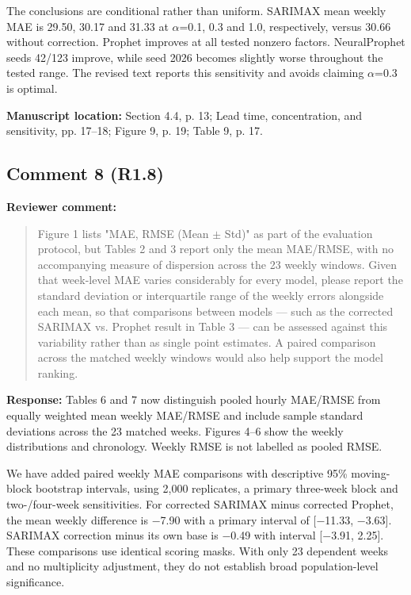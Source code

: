 \documentclass[11pt,a4paper]{article}
\begin{document}
The conclusions are conditional rather than uniform. SARIMAX mean weekly MAE is 29.50, 30.17 and 31.33 at $\alpha$=0.1, 0.3 and 1.0, respectively, versus 30.66 without correction. Prophet improves at all tested nonzero factors. NeuralProphet seeds 42/123 improve, while seed 2026 becomes slightly worse throughout the tested range. The revised text reports this sensitivity and avoids claiming $\alpha$=0.3 is optimal.

\textbf{Manuscript location:} Section 4.4, p. 13; Lead time, concentration, and sensitivity, pp. 17--18; Figure 9, p. 19; Table 9, p. 17.
\begin{samepage}
\subsection*{Comment 8 (R1.8)}
\textbf{Reviewer comment:}
\begin{quote}\small Figure 1 lists "MAE, RMSE (Mean $\pm$ Std)" as part of the evaluation protocol, but Tables 2 and 3 report only the mean MAE/RMSE, with no accompanying measure of dispersion across the 23 weekly windows. Given that week-level MAE varies considerably for every model, please report the standard deviation or interquartile range of the weekly errors alongside each mean, so that comparisons between models --- such as the corrected SARIMAX vs. Prophet result in Table 3 --- can be assessed against this variability rather than as single point estimates. A paired comparison across the matched weekly windows would also help support the model ranking.\end{quote}
\end{samepage}
\textbf{Response:}
Tables 6 and 7 now distinguish pooled hourly MAE/RMSE from equally weighted mean weekly MAE/RMSE and include sample standard deviations across the 23 matched weeks. Figures 4--6 show the weekly distributions and chronology. Weekly RMSE is not labelled as pooled RMSE.

We have added paired weekly MAE comparisons with descriptive 95\% moving-block bootstrap intervals, using 2,000 replicates, a primary three-week block and two-/four-week sensitivities. For corrected SARIMAX minus corrected Prophet, the mean weekly difference is $-$7.90 with a primary interval of [$-$11.33, $-$3.63]. SARIMAX correction minus its own base is $-$0.49 with interval [$-$3.91, 2.25]. These comparisons use identical scoring masks. With only 23 dependent weeks and no multiplicity adjustment, they do not establish broad population-level significance.
\end{document}
